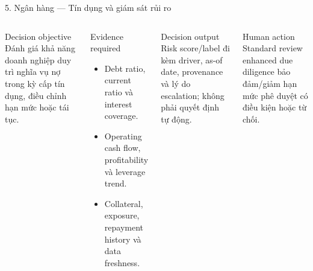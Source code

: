 \documentclass[aspectratio=169,11pt]{beamer}
\begin{document}
\begin{frame}{5. Ngân hàng — Tín dụng và giám sát rủi ro}
  \scriptsize
  \begin{columns}[T,totalwidth=\textwidth]
      \begin{block}{Decision objective}
        Đánh giá khả năng doanh nghiệp duy trì nghĩa vụ nợ trong kỳ cấp tín dụng, điều chỉnh hạn mức hoặc tái tục.
      \end{block}
      \begin{block}{Evidence required}
        \begin{itemize}
          \item Debt ratio, current ratio và interest coverage.
          \item Operating cash flow, profitability và leverage trend.
          \item Collateral, exposure, repayment history và data freshness.
        \end{itemize}
      \end{block}
      \begin{exampleblock}{Decision output}
        Risk score/label đi kèm driver, as-of date, provenance và lý do escalation; không phải quyết định tự động.
      \end{exampleblock}
      \begin{alertblock}{Human action}
        Standard review \textrightarrow{} enhanced due diligence \textrightarrow{} bảo đảm/giảm hạn mức \textrightarrow{} phê duyệt có điều kiện hoặc từ chối.
      \end{alertblock}
  \end{columns}
\end{frame}
\end{document}
